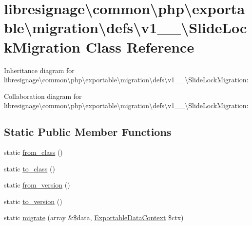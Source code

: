 \hypertarget{classlibresignage_1_1common_1_1php_1_1exportable_1_1migration_1_1defs_1_1v1__1__0_1_1SlideLockMigration}{}\section{libresignage\textbackslash{}common\textbackslash{}php\textbackslash{}exportable\textbackslash{}migration\textbackslash{}defs\textbackslash{}v1\+\_\+\_\textbackslash{}Slide\+Lock\+Migration Class Reference}
\label{classlibresignage_1_1common_1_1php_1_1exportable_1_1migration_1_1defs_1_1v1__1__0_1_1SlideLockMigration}


Inheritance diagram for libresignage\textbackslash{}common\textbackslash{}php\textbackslash{}exportable\textbackslash{}migration\textbackslash{}defs\textbackslash{}v1\+\_\+\_\textbackslash{}Slide\+Lock\+Migration\+:


Collaboration diagram for libresignage\textbackslash{}common\textbackslash{}php\textbackslash{}exportable\textbackslash{}migration\textbackslash{}defs\textbackslash{}v1\+\_\+\_\textbackslash{}Slide\+Lock\+Migration\+:
\subsection*{Static Public Member Functions}
\begin{DoxyCompactItemize}
\item 
static \hyperlink{classlibresignage_1_1common_1_1php_1_1exportable_1_1migration_1_1defs_1_1v1__1__0_1_1SlideLockMigration_a44e07bcc7d52b43a82764ef77d890520}{from\+\_\+class} ()
\item 
static \hyperlink{classlibresignage_1_1common_1_1php_1_1exportable_1_1migration_1_1defs_1_1v1__1__0_1_1SlideLockMigration_a906bf6a8bb8b01f617fd8a06ff8b79f2}{to\+\_\+class} ()
\item 
static \hyperlink{classlibresignage_1_1common_1_1php_1_1exportable_1_1migration_1_1defs_1_1v1__1__0_1_1SlideLockMigration_ad556108d4a6b187fca69ece8c1b28bb8}{from\+\_\+version} ()
\item 
static \hyperlink{classlibresignage_1_1common_1_1php_1_1exportable_1_1migration_1_1defs_1_1v1__1__0_1_1SlideLockMigration_a16116f2b333e8d0a86d3cd92a809820b}{to\+\_\+version} ()
\item 
static \hyperlink{classlibresignage_1_1common_1_1php_1_1exportable_1_1migration_1_1defs_1_1v1__1__0_1_1SlideLockMigration_aa693f9d96b66d208004aba2706968acb}{migrate} (array \&\$data, \hyperlink{classlibresignage_1_1common_1_1php_1_1exportable_1_1ExportableDataContext}{Exportable\+Data\+Context} \$ctx)
\end{DoxyCompactItemize}


